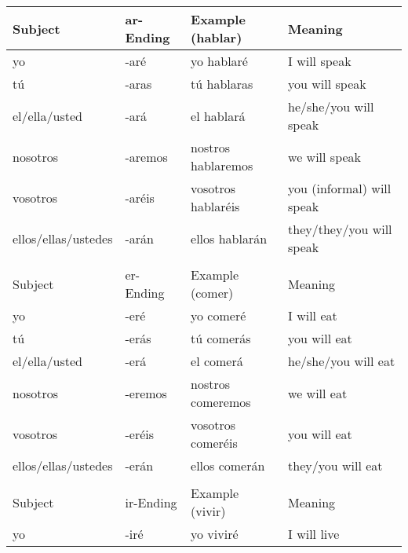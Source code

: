 \documentclass[a4paper,12pt]{article}
\begin{document}
\begin{itemize}
  \begin{table}[H]
    \centering
    \begin{tabular}{llll}
      Subject             & ar-Ending & Example (hablar)   & Meaning                         \\
      \toprule
      yo                  & -aré      & yo hablaré         & I will speak                    \\
      tú                  & -aras     & tú hablaras        & you will speak       \\
      el/ella/usted       & -ará      & el hablará         & he/she/you will speak  \\
      nosotros            & -aremos   & nostros hablaremos & we will speak                   \\
      vosotros            & -aréis    & vosotros hablaréis & you (informal) will speak       \\
      ellos/ellas/ustedes & -arán     & ellos hablarán     & they/they/you will speak \\
      \midrule
                          &           &                    &                                 \\
      Subject             & er-Ending & Example (comer)    & Meaning                         \\
      \toprule
      yo                  & -eré      & yo comeré          & I will eat                      \\
      tú                  & -erás     & tú comerás         & you will eat                    \\
      el/ella/usted       & -erá      & el comerá          & he/she/you will eat             \\
      nosotros            & -eremos   & nostros comeremos  & we will eat                     \\
      vosotros            & -eréis    & vosotros comeréis  & you will eat                    \\
      ellos/ellas/ustedes & -erán     & ellos comerán      & they/you will eat               \\
      \midrule
                          &           &                    &                                 \\
      Subject             & ir-Ending & Example (vivir)    & Meaning                         \\
      \toprule
      yo                  & -iré      & yo viviré          & I will live                     \\

\end{tabular}
\end{table}
\end{itemize}
\end{document}
